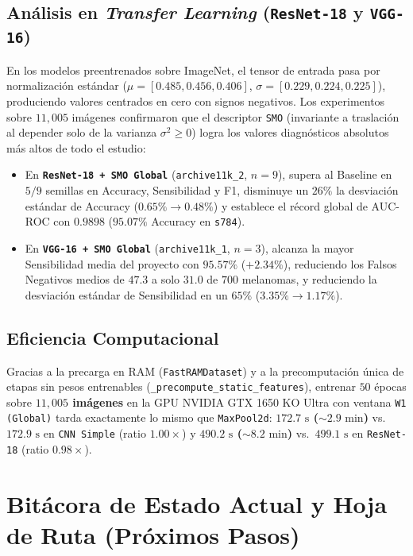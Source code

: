 \documentclass[10pt,a4paper,twocolumn]{article}
\begin{document}
\subsection{Análisis en \emph{Transfer Learning} (\texttt{ResNet-18} y \texttt{VGG-16})}
En los modelos preentrenados sobre ImageNet, el tensor de entrada pasa por normalización estándar ($\mu=[0.485,0.456,0.406]$, $\sigma=[0.229,0.224,0.225]$), produciendo valores centrados en cero con signos negativos. Los experimentos sobre $11{,}005$ imágenes confirmaron que el descriptor \texttt{SMO} (invariante a traslación al depender solo de la varianza $\sigma^2 \ge 0$) logra los valores diagnósticos absolutos más altos de todo el estudio:
\begin{itemize}[leftmargin=*,nosep]
  \item En \textbf{\texttt{ResNet-18 + SMO Global}} (\texttt{archive11k\_2}, $n=9$), supera al Baseline en $5/9$ semillas en Accuracy, Sensibilidad y F1, disminuye un $26\%$ la desviación estándar de Accuracy ($0.65\% \to 0.48\%$) y establece el récord global de AUC-ROC con $0.9898$ ($95.07\%$ Accuracy en \texttt{s784}).
  \item En \textbf{\texttt{VGG-16 + SMO Global}} (\texttt{archive11k\_1}, $n=3$), alcanza la mayor Sensibilidad media del proyecto con \textbf{$95.57\%$} ($+2.34\%$), reduciendo los Falsos Negativos medios de $47.3$ a solo $31.0$ de $700$ melanomas, y reduciendo la desviación estándar de Sensibilidad en un $65\%$ ($3.35\% \to 1.17\%$).
\end{itemize}

\subsection{Eficiencia Computacional}
Gracias a la precarga en RAM (\texttt{FastRAMDataset}) y a la precomputación única de etapas sin pesos entrenables (\texttt{\_precompute\_static\_features}), entrenar $50$ épocas sobre \textbf{$11{,}005$ imágenes} en la GPU NVIDIA GTX 1650 KO Ultra con ventana \texttt{W1 (Global)} tarda exactamente lo mismo que \texttt{MaxPool2d}: \textbf{$172.7\text{ s}$ ($\sim 2.9\text{ min}$)} vs.\ $172.9\text{ s}$ en \texttt{CNN Simple} (ratio $1.00\times$) y \textbf{$490.2\text{ s}$ ($\sim 8.2\text{ min}$)} vs.\ $499.1\text{ s}$ en \texttt{ResNet-18} (ratio $0.98\times$).

\section{Bitácora de Estado Actual y Hoja de Ruta (Próximos Pasos)}
\end{document}
